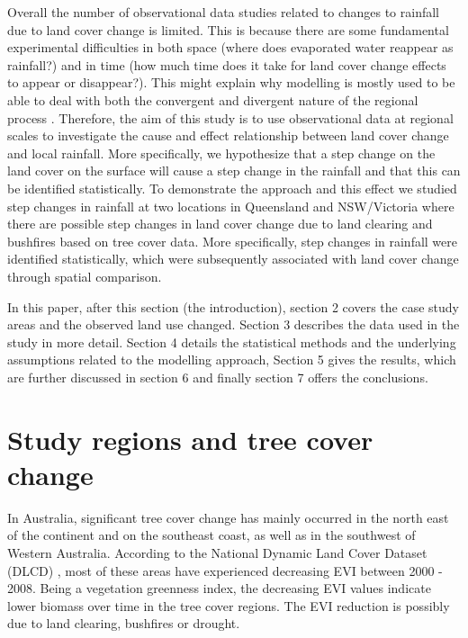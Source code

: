 \documentclass[onecolumn,referee]{svjour3}
\begin{document}
Overall the number of observational data studies related to changes to rainfall due to land cover change is limited. This is because there are some fundamental experimental difficulties in both space (where does evaporated water reappear as rainfall?) and in time (how much time does it take for land cover change effects to appear or disappear?). This might explain why modelling is mostly used to be able to deal with both the convergent and divergent nature of the regional process \citep{CEBON2000211}. Therefore, the aim of this study is to use observational data at regional scales to investigate the cause and effect relationship between land cover change and local rainfall. More specifically, we hypothesize that a step change on the land cover on the surface will cause a step change in the rainfall and that this can be identified statistically. To demonstrate the approach and this effect we studied step changes in rainfall at two locations in Queensland and NSW/Victoria where there are possible step changes in land cover change due to land clearing and bushfires based on tree cover data. More specifically,  step changes in rainfall were identified statistically, which were subsequently associated with land cover change through spatial comparison.

In this paper, after this section (the introduction), section 2 covers the case study areas and the observed land use changed. Section 3 describes the data used in the study in more detail. Section 4 details the statistical methods and the underlying assumptions related to the modelling approach, Section 5 gives the results, which are further discussed in section 6 and finally section 7 offers the conclusions.  

\section{Study regions and tree cover change}

In Australia, significant tree cover change has mainly occurred in the north east of the continent and on the southeast coast, as well as in the southwest of Western Australia. According to the National Dynamic Land Cover Dataset (DLCD) \citep{Lymburner2010}, most of these areas have experienced decreasing EVI between 2000 - 2008. Being a vegetation greenness index, the decreasing EVI values indicate lower biomass over time in the tree cover regions. The EVI reduction is possibly due to land clearing, bushfires or drought. 
\end{document}
